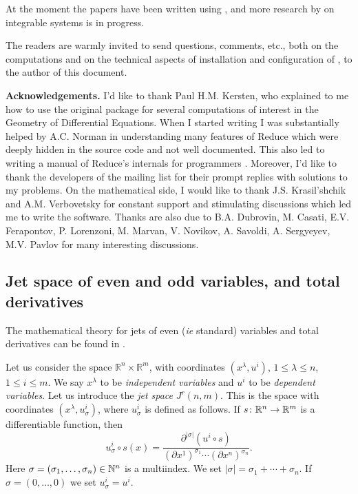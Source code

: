 At the moment the papers
\cite{Ferapontov:2014,Ferapontov:2016,KerstenKrasilshchikVerbovetskyVitolo:HSGP,KrasilshchikVerbovetskyVitolo:SPT:2012,PavlovVitolo:2015,SaccomandiVitolo:2014}
have been written using \cde, and more research by \cde on integrable systems
is in progress.

The readers are warmly invited to send questions, comments, etc., both on the
computations and on the technical aspects of installation and configuration of
\REDUCE, to the author of this document.

\textbf{Acknowledgements.} I'd like to thank Paul H.M. Kersten, who explained
to me how to use the original \cdiff package for several computations of
interest in the Geometry of Differential Equations. When I started writing \cde
I was substantially helped by A.C. Norman in understanding many features of
Reduce which were deeply hidden in the source code and not well
documented. This also led to writing a manual of Reduce's internals for
programmers \cite{NormanVitolo:InsideReduce}. Moreover, I'd like to thank the developers of the
\REDUCE mailing list for their prompt replies with solutions to my problems.
On the mathematical side, I would like to thank J.S. Krasil'shchik and
A.M. Verbovetsky for constant support and stimulating discussions which led me
to write the software. Thanks are also due to B.A. Dubrovin, M. Casati,
E.V. Ferapontov, P. Lorenzoni, M. Marvan, V. Novikov, A. Savoldi, A. Sergyeyev,
M.V. Pavlov for many interesting discussions.

\subsection{Jet space of even and odd variables,
  and total derivatives}
\label{cdesec:jet-space-even}

The mathematical theory for jets of even (\emph{ie} standard) variables and
total derivatives can be found in \cite{Krasilshchik:99,Olver:93}.

Let us consider the space $\mathbb{R}^n\times\mathbb{R}^m$, with coordinates
$(x^\lambda,u^i)$, $1\leq \lambda\leq n$, $1\leq i\leq m$. We say $x^\lambda$
to be \emph{independent variables} and $u^i$ to be \emph{dependent variables}.
Let us introduce the \emph{jet space} $J^r(n,m)$. This is the space with
coordinates $(x^\lambda,u^i_\sigma)$, where $u^i_\sigma$ is defined as follows.
If $s\colon \mathbb{R}^n\to \mathbb{R}^m$ is a differentiable function, then
\begin{displaymath}
  u^i_\sigma\circ s(x)=\frac{\partial^{|\sigma|}(u^i\circ s)}
  {(\partial x^1)^{\sigma_1}\cdots (\partial x^n)^{\sigma_n}}.
\end{displaymath}
Here $\sigma=(\sigma_1,\ldots,\sigma_n)\in\mathbb{N}^n$ is a multiindex. We set
$|\sigma|=\sigma_1+\cdots+\sigma_n$. If $\sigma=(0,\ldots,0)$ we set
$u^i_\sigma=u^i$.


